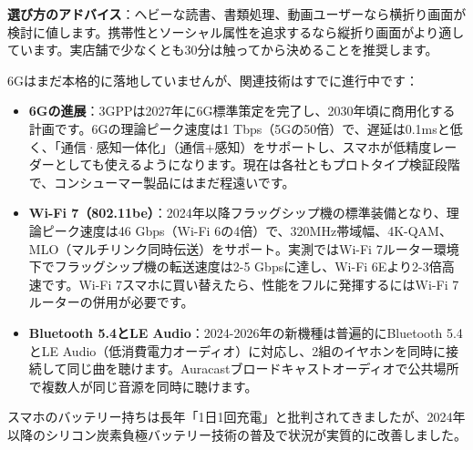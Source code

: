 \textbf{選び方のアドバイス}：ヘビーな読書、書類処理、動画ユーザーなら横折り画面が検討に値します。携帯性とソーシャル属性を追求するなら縦折り画面がより適しています。実店舗で少なくとも30分は触ってから決めることを推奨します。


6Gはまだ本格的に落地していませんが、関連技術はすでに進行中です：

\begin{itemize}
  \item \textbf{6Gの進展}：3GPPは2027年に6G標準策定を完了し、2030年頃に商用化する計画です。6Gの理論ピーク速度は1 Tbps（5Gの50倍）で、遅延は0.1msと低く、「通信·感知一体化」（通信+感知）をサポートし、スマホが低精度レーダーとしても使えるようになります。現在は各社ともプロトタイプ検証段階で、コンシューマー製品にはまだ程遠いです。
  \item \textbf{Wi-Fi 7（802.11be）}：2024年以降フラッグシップ機の標準装備となり、理論ピーク速度は46 Gbps（Wi-Fi 6の4倍）で、320MHz帯域幅、4K-QAM、MLO（マルチリンク同時伝送）をサポート。実測ではWi-Fi 7ルーター環境下でフラッグシップ機の転送速度は2-5 Gbpsに達し、Wi-Fi 6Eより2-3倍高速です。Wi-Fi 7スマホに買い替えたら、性能をフルに発揮するにはWi-Fi 7ルーターの併用が必要です。
  \item \textbf{Bluetooth 5.4とLE Audio}：2024-2026年の新機種は普遍的にBluetooth 5.4とLE Audio（低消費電力オーディオ）に対応し、2組のイヤホンを同時に接続して同じ曲を聴けます。Auracastブロードキャストオーディオで公共場所で複数人が同じ音源を同時に聴けます。
\end{itemize}


スマホのバッテリー持ちは長年「1日1回充電」と批判されてきましたが、2024年以降のシリコン炭素負極バッテリー技術の普及で状況が実質的に改善しました。


